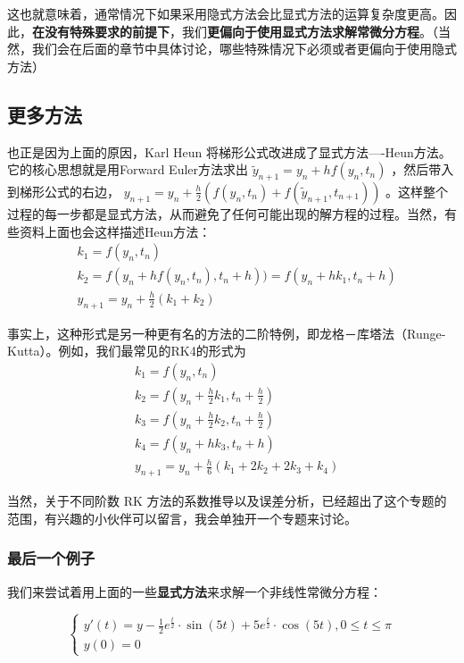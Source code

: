 这也就意味着，通常情况下如果采用隐式方法会比显式方法的运算复杂度更高。因此，\textbf{在没有特殊要求的前提下}，我们\textbf{更偏向于使用显式方法求解常微分方程}。（当然，我们会在后面的章节中具体讨论，哪些特殊情况下必须或者更偏向于使用隐式方法）

\subsection{更多方法}

也正是因为上面的原因，Karl Heun 将梯形公式改进成了显式方法----Heun方法。它的核心思想就是用Forward Euler方法求出 $\tilde{y}_{n+1}=y_n+hf(y_n,t_n)$ ，然后带入到梯形公式的右边， $y_{n+1}=y_n+\frac{h}{2}\left(f(y_n,t_n)+f(\tilde{y}_{n+1},t_{n+1}) \right)$ 。这样整个过程的每一步都是显式方法，从而避免了任何可能出现的解方程的过程。当然，有些资料上面也会这样描述Heun方法：
\begin{equation}
\begin{aligned}
&k_1=f(y_n,t_n)\\
&k_2=f(y_n+hf(y_n,t_n),t_n+h))=f(y_n+hk_1,t_n+h)\\
&y_{n+1}=y_n+\frac{h}{2}(k_1+k_2)
\end{aligned}
\end{equation}

事实上，这种形式是另一种更有名的方法的二阶特例，即龙格－库塔法（Runge-Kutta）。例如，我们最常见的RK4的形式为
\begin{equation}
\begin{aligned}
&k_1=f(y_n,t_n)\\
&k_2=f\left(y_n+\frac{h}{2}k_1, t_n+\frac{h}{2}\right)\\
&k_3=f\left(y_n+\frac{h}{2}k_2, t_n+\frac{h}{2}\right)\\
&k_4=f\left(y_n+hk_3, t_n+h\right)\\
&y_{n+1}=y_{n}+\frac{h}{6}(k_1+2k_2+2k_3+k_4)
\end{aligned}
\end{equation}

当然，关于不同阶数 RK 方法的系数推导以及误差分析，已经超出了这个专题的范围，有兴趣的小伙伴可以留言，我会单独开一个专题来讨论。

\subsubsection{最后一个例子}

我们来尝试着用上面的一些\textbf{显式方法}来求解一个非线性常微分方程：

\begin{equation}
\begin{cases}
 y'(t) = y-\frac{1}{2}e^{\frac{t}{2}}\cdot\sin(5t)+5e^{\frac{t}{2}}\cdot\cos(5t), 0\le t\le \pi\\ y(0)=0
\end{cases}
\end{equation}

